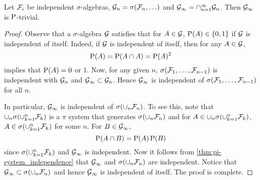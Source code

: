 \begin{theorem}
    Let $\F_i$ be independent $\sigma$-algebras, $\G_n = \sigma(\F_n,\ldots)$ and 
    $\G_{\infty} = \cap_{n=1}^\infty\G_n$. Then $\G_\infty$ is $\P$-trivial. 
\end{theorem}
\begin{proof}
    Observe that a $\sigma$-algebra $\G$ satisfies that for $A\in\G$, $\P(A)\in\set{0,1}$ 
    if $\G$ is independent of itself. Indeed, if $\G$ is independent of 
    itself, then for any $A\in\G$, 
    \begin{equation*}
        \P(A) = \P(A\cap A) = \P(A)^2
    \end{equation*}
    implies that $\P(A) = 0$ or $1$. Now, for any given $n$, 
    $\sigma(\F_1,\ldots,\F_{n-1})$ is independent with $\G_n$ and $\G_\infty\subset\G_n$. 
    Hence $\G_\infty$ is independent of $\sigma(\F_1,\ldots,\F_{n-1})$ for all $n$. 
    
    In particular, $\G_\infty$ is independent of $\sigma(\cup_n\F_n)$. 
    To see this, note that $\cup_n\sigma(\cup_{k=1}^n\F_k)$ is a $\pi$ system that 
    generates $\sigma(\cup_n\F_n)$ and for $A\in\cup_n\sigma(\cup_{k=1}^n\F_k)$, 
    $A\in\sigma(\cup_{k=1}^n\F_k)$ for some $n$. For $B\in\G_\infty$, 
    \begin{equation*}
        \P(A\cap B) = \P(A)\P(B)
    \end{equation*}
    since $\sigma(\cup_{k=1}^n\F_k)$ and $\G_\infty$ is independent. Now it 
    follows from \cref{thm:pi-system_independence} that $\G_\infty$ and 
    $\sigma(\cup_n\F_n)$ are independent. Notice that $\G_\infty\subset\sigma(\cup_n\F_n)$ 
    and hence $\G_\infty$ is independent of itself. The proof is complete. 
\end{proof}

